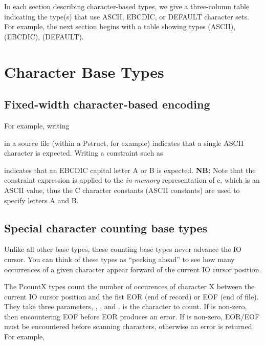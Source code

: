In each section describing character-based types, we give a
three-column table indicating the type(s) that use ASCII, EBCDIC, or
DEFAULT character sets.  For example, the next section begins with a
table showing types  (ASCII),  (EBCDIC), 
(DEFAULT).

\section{Character Base Types}

\subsection{Fixed-width character-based encoding}

\aedBegin{}
\aedEnd{}
\myvskip{1ex}

\noindent
For example,  writing

%
\noindent
in a \PADSL{} source file (within a Pstruct, for example) indicates
that a single ASCII character is expected.  Writing a constraint
such as 

%
\noindent
indicates that an EBCDIC capital letter A or B is expected.
{\bf NB:}\/ Note that the constraint expression is applied to the
{\em in-memory\/} representation of c, which is an ASCII value,
thus the C character constants (ASCII constants)
are used to specify letters A and B.

\subsection{Special character counting base types}

\aedBegin{}
\aedEnd{}

Unlike all other base types, these counting base types
never advance the IO cursor.  You can think of these types as
``peeking ahead'' to see how many occurrences of a given character
appear forward of the current IO cursor position.

The PcountX types count the number of occurences of character X
between the current IO cursor position and the fist EOR (end of
record) or EOF (end of file).  They take three parameters, ,
, and .   is the character to count.  If
 is non-zero, then encountering EOF before EOR produces
an error.  If  is non-zero, EOR/EOF must be encountered
before scanning  characters, otherwise an error is returned.
For example,

